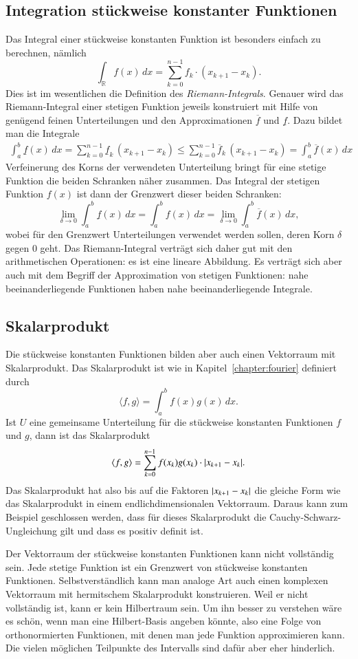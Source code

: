 \subsection{Integration stückweise konstanter Funktionen}
Das Integral einer stückweise konstanten Funktion ist besonders einfach 
zu berechnen, nämlich
\[
\int_{\mathbb R} f(x)\,dx = \sum_{k=0}^{n-1} f_k\cdot (x_{k+1}-x_k).
\]
Dies ist im wesentlichen die Definition des {\em Riemann-Integrals}.
%
Genauer wird das Riemann-Integral einer stetigen Funktion jeweils
konstruiert mit Hilfe von genügend feinen Unterteilungen und den
Approximationen $\overline{f}$ und $\underline{f}$.
Dazu bildet man die Integrale
\begin{align*}
\int_a^b \underline{f}(x)\,dx
=
\sum_{k=0}^{n-1} \underline{f}_{k}\,(x_{k+1}-x_k)
\le
\sum_{k=0}^{n-1} \overline{f}_{k}\,(x_{k+1}-x_k)
=
\int_a^b \overline{f}(x)\,dx
\end{align*}
Verfeinerung des Korns der verwendeten Unterteilung bringt für eine
stetige Funktion die beiden Schranken näher zusammen.
Das Integral der stetigen Funktion $f(x)$ ist dann der Grenzwert
dieser beiden Schranken:
\[
\lim_{\delta\to 0}
\int_a^b \underline{f}(x)\,dx
=
\int_a^b f(x)\,dx
=
\lim_{\delta\to 0}
\int_a^b \overline{f}(x)\,dx,
\]
wobei für den Grenzwert Unterteilungen verwendet werden sollen, deren
Korn $\delta$ gegen $0$ geht.
Das Riemann-Integral verträgt sich daher gut mit den arithmetischen
Operationen: es ist eine lineare Abbildung.
Es verträgt sich aber auch mit dem Begriff der Approximation von
stetigen Funktionen: nahe beeinanderliegende Funktionen haben nahe
beeinanderliegende Integrale.

\subsection{Skalarprodukt}
Die stückweise konstanten Funktionen bilden aber auch einen Vektorraum
mit Skalarprodukt.
Das Skalarprodukt ist wie in Kapitel~\ref{chapter:fourier} definiert durch
\[
\langle f,g\rangle
=
\int_a^b
f(x) g(x)\,dx.
\]
Ist $U$ eine gemeinsame Unterteilung für die stückweise konstanten
Funktionen $f$ und $g$, dann ist das Skalarprodukt
\[
\langle f,g\rangle
=
\sum_{k=0}^{n-1} f(x_k) g(x_k) \cdot |x_{k+1}-x_{k\mathstrut}|.
\]
Das Skalarprodukt hat also bis auf die Faktoren $|x_{k+1}-x_{k\mathstrut}|$
die gleiche Form wie das Skalarprodukt in einem endlichdimensionalen
Vektorraum.
Daraus kann zum Beispiel geschlossen werden, dass für dieses Skalarprodukt
die Cauchy-Schwarz-Ungleichung gilt und dass es positiv definit ist.

Der Vektorraum der stückweise konstanten Funktionen kann nicht vollständig
sein.
Jede stetige Funktion ist ein Grenzwert von stückweise konstanten
Funktionen.
Selbstverständlich kann man analoge Art auch einen komplexen
Vektorraum mit hermitschem Skalarprodukt konstruieren.
Weil er nicht vollständig ist, kann er kein Hilbertraum sein.
Um ihn besser zu verstehen wäre es schön, wenn man eine Hilbert-Basis
angeben könnte, also eine Folge von orthonormierten Funktionen, mit
denen man jede Funktion approximieren kann.
Die vielen möglichen Teilpunkte des Intervalls sind dafür aber eher 
hinderlich.


